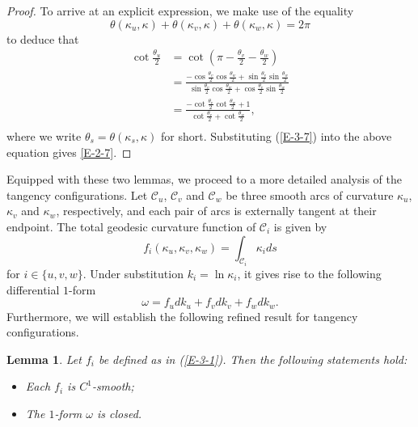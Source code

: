 \documentclass[11pt,leqno]{article}
\numberwithin{equation}{section}
\newtheorem{lemma}[theorem]{Lemma}
\theoremstyle{definition}
\begin{document}
\begin{proof}
To arrive at an explicit expression,  we make use of the equality
$$
\theta(\kappa_u,\kappa)+\theta(\kappa_v,\kappa)+\theta(\kappa_w,\kappa)=2\pi
$$
to deduce that
\[
\begin{aligned}
\cot\frac{\theta_u}{2}&=\cot(\pi-\frac{\theta_v}{2}-\frac{\theta_w}{2})\\
& =\frac{-\cos \frac{\theta_v}{2} \cos \frac{\theta_w}{2}+\sin \frac{\theta_v}{2} \sin \frac{\theta_w}{2}}{\sin \frac{\theta_v}{2} \cos \frac{\theta_w}{2}+\cos \frac{\theta_v}{2} \sin \frac{\theta_w}{2}}\\
&=\frac{-\cot \frac{\theta_v}{2} \cot \frac{\theta_w}{2}+1}{\cot \frac{\theta_v}{2}+\cot \frac{\theta_w}{2}},\\
\end{aligned}
\]
where we write $\theta_s=\theta(\kappa_s,\kappa)$ for short.
Substituting (\ref{E-3-7}) into the above equation gives \eqref{E-2-7}.

\end{proof}

Equipped with these two lemmas, we proceed to a more detailed analysis of the tangency configurations.
Let $\mathcal C_u$, $\mathcal C_v$ and $\mathcal C_w$ be three smooth arcs of curvature  $\kappa_u$, $\kappa_v$ and $\kappa_w$, respectively, and each pair of arcs is externally tangent at their endpoint.
The total geodesic curvature function of $\mathcal C_i$ is given by
\begin{equation}\label{E-3-1}f_i(\kappa_u,\kappa_v,\kappa_w)=\int_{\mathcal C_i}\kappa_ids\end{equation}
for $i\in\{u,v,w\}$. Under substitution $k_i=\ln\kappa_i$,  it gives rise to the following differential $1$-form
\[
\omega=f_udk_u+f_vdk_v+f_wdk_w.
\]
Furthermore, we will establish the following refined result for tangency configurations.
\begin{lemma}\label{L-3-1}
Let $f_i$ be defined as in (\ref{E-3-1}). Then the following statements hold:
\begin{itemize}
\item[($i$)]  Each $f_i$ is $C^1$-smooth;
\item[($ii$)] The $1$-form $\omega$ is closed.
\end{itemize}
\end{lemma}
\end{document}
